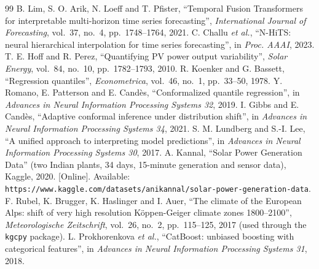 \documentclass[12pt]{report}
\begin{document}
\begin{thebibliography}{99}
 B. Lim, S. O. Arik, N. Loeff and T. Pfister, ``Temporal Fusion Transformers for interpretable multi-horizon time series forecasting'', \textit{International Journal of Forecasting}, vol.~37, no.~4, pp.~1748--1764, 2021.
 C. Challu \textit{et al.}, ``N-HiTS: neural hierarchical interpolation for time series forecasting'', in \textit{Proc. AAAI}, 2023.
 T. E. Hoff and R. Perez, ``Quantifying PV power output variability'', \textit{Solar Energy}, vol.~84, no.~10, pp.~1782--1793, 2010.
 R. Koenker and G. Bassett, ``Regression quantiles'', \textit{Econometrica}, vol.~46, no.~1, pp.~33--50, 1978.
 Y. Romano, E. Patterson and E. Candès, ``Conformalized quantile regression'', in \textit{Advances in Neural Information Processing Systems 32}, 2019.
 I. Gibbs and E. Candès, ``Adaptive conformal inference under distribution shift'', in \textit{Advances in Neural Information Processing Systems 34}, 2021.
 S. M. Lundberg and S.-I. Lee, ``A unified approach to interpreting model predictions'', in \textit{Advances in Neural Information Processing Systems 30}, 2017.
 A. Kannal, ``Solar Power Generation Data'' (two Indian plants, 34 days, 15-minute generation and sensor data), Kaggle, 2020. [Online]. Available: \texttt{https://www.kaggle.com/datasets/anikannal/solar-power-generation-data}.
 F. Rubel, K. Brugger, K. Haslinger and I. Auer, ``The climate of the European Alps: shift of very high resolution Köppen-Geiger climate zones 1800--2100'', \textit{Meteorologische Zeitschrift}, vol.~26, no.~2, pp.~115--125, 2017 (used through the \texttt{kgcpy} package).
 L. Prokhorenkova \textit{et al.}, ``CatBoost: unbiased boosting with categorical features'', in \textit{Advances in Neural Information Processing Systems 31}, 2018.
\end{thebibliography}
\endgroup
\end{document}
